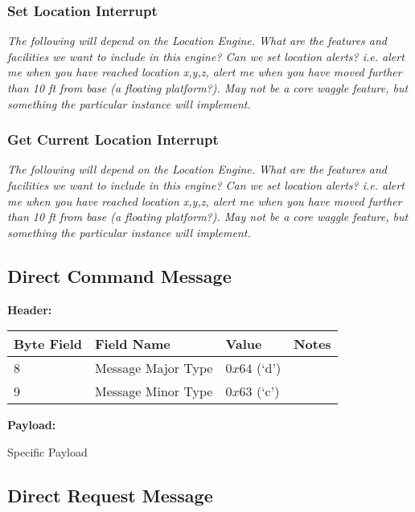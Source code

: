 \subsubsection{Set Location Interrupt}
\begin{framed}
\textit{The following will depend on the Location Engine.
What are the features and facilities we want to include in this
engine? Can we set location alerts? i.e. alert me when you have
reached location x,y,z, alert me when you have moved further
than 10 ft from base (a floating platform?). May not
be a core waggle feature, but something the particular
instance will implement.}
\end{framed}
\subsubsection{Get Current Location Interrupt}
\begin{framed}
\textit{The following will depend on the Location Engine.
What are the features and facilities we want to include in this
engine? Can we set location alerts? i.e. alert me when you have
reached location x,y,z, alert me when you have moved further
than 10 ft from base (a floating platform?). May not be a
core waggle feature, but something the particular
instance will implement.}
\end{framed}

\subsection{Direct Command Message}

\textbf{Header:}
\begin{center}
    \begin{tabular}{ | l | l | p{3cm} | p{5cm} |}
    \hline
    \hline
    \textbf{Byte Field} & \textbf{Field Name} & \textbf{Value} & \textbf{Notes} \\ \hline \hline
    8 & Message Major Type & $0x64$ (`d') &  \\    \hline
    9 & Message Minor Type & $0x63$ (`c') &  \\    \hline
    \end{tabular}
\end{center}
\noindent
\textbf{Payload:}
\begin{framed}
Specific Payload
\end{framed}


\subsection{Direct Request Message}

